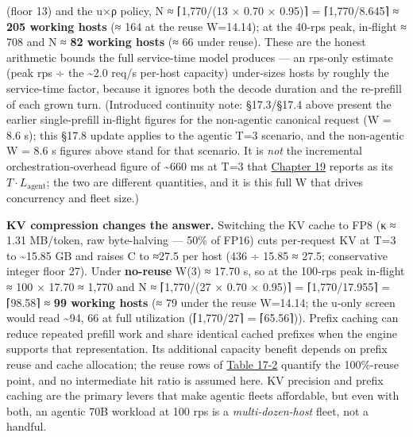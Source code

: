 (floor 13) and the u×ρ policy, N ≈ ⌈1,770/(13 × 0.70 × 0.95)⌉ =
⌈1,770/8.645⌉ ≈ \textbf{205 working hosts} (≈ 164 at the reuse W=14.14);
at the 40‑rps peak, in‑flight ≈ 708 and N ≈ \textbf{82 working hosts} (≈
66 under reuse). These are the honest arithmetic bounds the full
service-time model produces --- an rps-only estimate (peak rps ÷ the
\textasciitilde2.0 req/s per-host capacity) under-sizes hosts by roughly
the service-time factor, because it ignores both the decode duration and
the re-prefill of each grown turn. (Introduced continuity note:
§17.3/§17.4 above present the earlier single-prefill in-flight figures
for the non-agentic canonical request (W = 8.6 s); this §17.8 update
applies to the agentic T=3 scenario, and the non-agentic W = 8.6 s
figures above stand for that scenario. It is \emph{not} the incremental
orchestration‑overhead figure of \textasciitilde660 ms at T=3 that
\hyperref[chap:19]{Chapter 19} reports as its \(T \cdot L_\text{agent}\); the two are
different quantities, and it is this full W that drives concurrency and
fleet size.)

\textbf{KV compression changes the answer.} Switching the KV cache to
FP8 (κ ≈ 1.31 MB/token, raw byte-halving --- 50\% of FP16) cuts
per‑request KV at T=3 to \textasciitilde15.85 GB and raises C to ≈27.5
per host (436 ÷ 15.85 ≈ 27.5; conservative integer floor 27). Under
\textbf{no-reuse} W(3) ≈ 17.70 s, so at the 100‑rps peak in‑flight ≈ 100
× 17.70 ≈ 1,770 and N ≈ ⌈1,770/(27 × 0.70 × 0.95)⌉ = ⌈1,770/17.955⌉ =
⌈98.58⌉ ≈ \textbf{99 working hosts} (≈ 79 under the reuse W=14.14; the
u-only screen would read \textasciitilde94, 66 at full utilization
(⌈1,770/27⌉ = ⌈65.56⌉)). Prefix caching can reduce repeated prefill work
and share identical cached prefixes when the engine supports that
representation. Its additional capacity benefit depends on prefix reuse
and cache allocation; the reuse rows of \hyperref[tab:17.2]{Table 17-2} quantify the
100\%-reuse point, and no intermediate hit ratio is assumed here. KV
precision and prefix caching are the primary levers that make agentic
fleets affordable, but even with both, an agentic 70B workload at 100
rps is a \emph{multi‑dozen‑host} fleet, not a handful.

